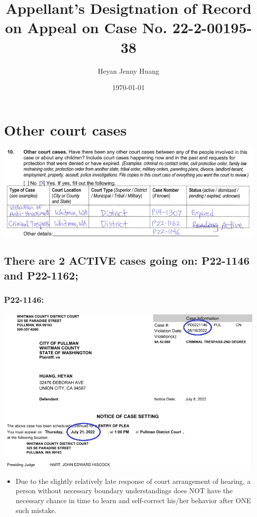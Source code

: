 \documentclass[9pt, b5paper]{article}
\author{Heyan Jenny Huang}
\date{\today}
\title{Appellant's Desigtnation of Record on Appeal on Case No. 22-2-00195-38}
\begin{document}
\maketitle
\tableofcontents


\section{Other court cases}
\label{sec-1}

\includegraphics[width=.9\linewidth]{./pic/dearCousin_20220919_153339.png}
\subsection{There are 2 ACTIVE cases going on: \textbf{P22-1146} and \textbf{P22-1162};}
\label{sec-1-1}
\subsubsection{\textbf{P22-1146:}}
\label{sec-1-1-1}

\includegraphics[width=.9\linewidth]{./pic/dearCousin_20220919_185022.png}
\begin{itemize}
\item Due to the slightly relatively late response of court arrangement of hearing, a person without necessary boundary understandings does NOT have the necessary chance in time to learn and self-correct his/her behavior after ONE such mistake.
\end{itemize}
\end{document}
